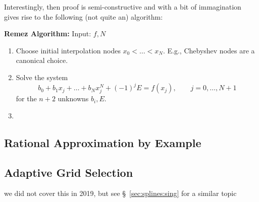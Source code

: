 Interestingly, then proof is semi-constructive and with a bit of immagination 
gives rise to the following (not quite an) algorithm:

{\bf Remez Algorithm:} Input: $f, N$
\begin{enumerate}
\item Choose initial interpolation nodes $x_0 < \dots < x_N$. E.g., Chebyshev 
nodes are a canonical choice. 
\item Solve the system 
\[
      b_0 + b_1 x_j + \dots + b_{N} x_{j}^{N} + (-1)^j E = f(x_j), 
      \qquad j = 0, \dots, N+1
\]
for the $n+2$ unknowns $b_i, E$.
\item 
\end{enumerate}



\subsection{Rational Approximation by Example}



\subsection{Adaptive Grid Selection}
%
\alert{we did not cover this in 2019, but see \S~\ref{sec:splines:sing} 
for a similar topic}

